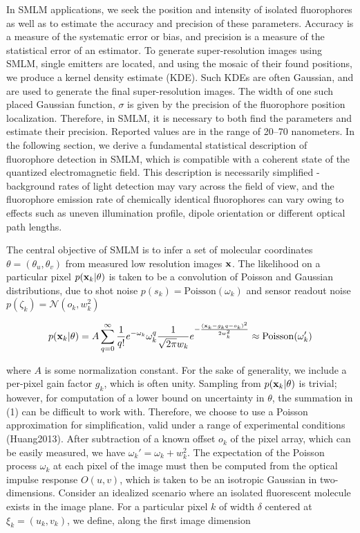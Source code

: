 In SMLM applications, we seek the position and intensity of isolated fluorophores as well as to estimate the accuracy and precision of these parameters. Accuracy is a measure of the systematic error or bias, and precision is a measure of the statistical error of an estimator. To generate super-resolution images using SMLM, single emitters are located, and using the mosaic of their found positions, we produce a kernel density estimate (KDE). Such KDEs are often Gaussian, and are used to generate the final super-resolution images. The width of one such placed Gaussian function, $\sigma$ is given by the precision of the fluorophore position localization. Therefore, in SMLM, it is necessary to both find the parameters and estimate their precision. Reported values are in the range of 20–70 nanometers. In the following section, we derive a fundamental statistical description of fluorophore detection in SMLM, which is compatible with a coherent state of the quantized electromagnetic field. This description is necessarily simplified - background rates of light detection may vary across the field of view, and the fluorophore emission rate of chemically identical fluorophores can vary owing to effects such as uneven illumination profile, dipole orientation or different optical path lengths.


The central objective of SMLM is to infer a set of molecular coordinates $\theta=(\theta_{u},\theta_{v})$ from measured low resolution images $\bold{x}$. The likelihood on a particular pixel $p(\bold{x}_k\lvert\theta)$ is taken to be a convolution of Poisson and Gaussian distributions, due to shot noise $p(s_{k}) = \mathrm{Poisson}(\omega_{k})$ and sensor readout noise $p(\zeta_{k}) = \mathcal{N}(o_{k},w_{k}^{2})$ 

\begin{equation}
p(\bold{x}_{k}\lvert\theta) = A\sum_{q=0}^{\infty} \frac{1}{q!}e^{-\omega_{k}}\omega_{k}^{q}\frac{1}{\sqrt{2\pi}w_{k}}e^{-\frac{(\bold{x}_{k}-g_{k}q-o_{k})^2}{2 w_{k}^{2}}} \approx \mathrm{Poisson}(\omega_{k}')
\end{equation}


where $A$ is some normalization constant. For the sake of generality, we include a per-pixel gain factor $g_{k}$, which is often unity. Sampling from $p(\bold{x}_{k}\lvert\theta)$ is trivial; however, for computation of a lower bound on uncertainty in $\theta$, the summation in (1) can be difficult to work with. Therefore, we choose to use a Poisson approximation for simplification, valid under a range of experimental conditions (Huang2013). After subtraction of a known offset $o_{k}$ of the pixel array, which can be easily measured, we have $\omega_{k}' = \omega_{k} + w_{k}^{2}$. The expectation of the Poisson process $\omega_{k}$ at each pixel of the image must then be computed from the optical impulse response $O(u,v)$, which is taken to be an isotropic Gaussian in two-dimensions. Consider an idealized scenario where an isolated fluorescent molecule exists in the image plane. For a particular pixel $k$ of width $\delta$ centered at $\xi_{k}=(u_k,v_k)$, we define, along the first image dimension

